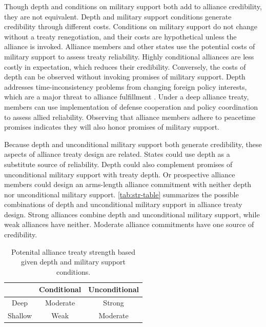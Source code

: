 \documentclass[12pt]{article}
\begin{document}
Though depth and conditions on military support both add to alliance credibility, they are not equivalent. 
Depth and military support conditions generate credibility through different costs. 
Conditions on military support do not change without a treaty renegotiation, and their costs are hypothetical unless the alliance is invoked.  
Alliance members and other states use the potential costs of military support to assess treaty reliability. 
Highly conditional alliances are less costly in expectation, which reduces their credibility. 
Conversely, the costs of depth can be observed without invoking promises of military support. 
Depth addresses time-inconsistency problems from changing foreign policy interests, which are a major threat to alliance fulfillment \citep{LeedsSavun2007}. 
Under a deep alliance treaty, members can use implementation of defense cooperation and policy coordination to assess allied reliability. 
Observing that alliance members adhere to peacetime promises indicates they will also honor promises of military support. 


Because depth and unconditional military support both generate credibility, these aspects of alliance treaty design are related. 
States could use depth as a substitute source of reliability.
Depth could also complement promises of unconditional military support with treaty depth. 
Or prospective alliance members could design an arms-length alliance commitment with neither depth nor unconditional military support. 
\autoref{tab:str-table} summarizes the possible combinations of depth and unconditional military support in alliance treaty design. 
Strong alliances combine depth and unconditional military support, while weak alliances have neither. 
Moderate alliance commitments have one source of credibility. 


\begin{table}[hbt!]
\begin{center}
\caption{Potenital alliance treaty strength based given depth and military support conditions.}
\begin{tabular}{ccc} 
                 & Conditional & Unconditional \\
\toprule
          Deep   &  Moderate & Strong \\
         Shallow & Weak      & Moderate \\
 \bottomrule
\end{tabular}
\label{tab:str-table}
\end{center} 
\end{table}
\end{document}
